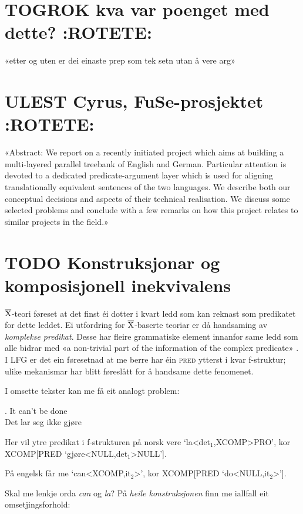 \documentclass[11pt,a4paper,oneside,draft]{book}
\newcommand{\xbar}{$\rm\overline{X}$}
\begin{document}
\section{\textbf{TOGROK} kva var poenget med dette? \textbf{:ROTETE:}}
\label{sec-3.17}

«etter og uten er dei einaste prep som tek setn utan å vere arg»
\section{\textbf{ULEST} Cyrus, FuSe-prosjektet \textbf{:ROTETE:}}
\label{sec-3.18}

\citet{cyrus2004apa}
«Abstract: We report on a recently initiated project which aims at
building a multi-layered parallel treebank of English and
German. Particular attention is devoted to a dedicated
predicate-argument layer which is used for aligning translationally
equivalent sentences of the two languages. We describe both our
conceptual decisions and aspects of their technical realisation. We
discuss some selected problems and conclude with a few remarks on how
this project relates to similar projects in the field.»
\section{\textbf{TODO} Konstruksjonar og komposisjonell inekvivalens}
\label{sec-3.19}

\xbar-teori føreset at det finst éi dotter i kvart ledd som kan
reknast som predikatet for dette leddet. Ei utfordring for
\xbar-baserte teoriar er då handsaming av \emph{komplekse predikat}. Desse
har fleire grammatiske element innanfor same ledd som alle bidrar med
«a non-trivial part of the information of the complex predicate»
\citep{alsina1997cp}. I LFG er det ein føresetnad at me berre har éin
\textsc{pred} ytterst i kvar f-struktur; ulike mekanismar har blitt
føreslått for å handsame dette fenomenet.

I omsette tekster kan me få eit analogt problem:

\ex. It can't be done \\
     Det lar seg ikke gjøre

Her vil ytre predikat i f-strukturen på norsk vere
`la<det$_1$,XCOMP>PRO', kor XCOMP[PRED `gjøre<NULL,det$_1$>NULL'].

På engelsk får me `can<XCOMP,it$_2$>', kor
XCOMP[PRED `do<NULL,it$_2$>']. 


Skal me lenkje orda \emph{can} og \emph{la}? På \emph{heile konstruksjonen} finn me
iallfall eit omsetjingsforhold:
\end{document}
